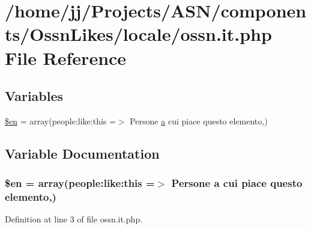 \hypertarget{components_2_ossn_likes_2locale_2ossn_8it_8php}{}\section{/home/jj/\+Projects/\+A\+S\+N/components/\+Ossn\+Likes/locale/ossn.it.\+php File Reference}
\label{components_2_ossn_likes_2locale_2ossn_8it_8php}
\subsection*{Variables}
\begin{DoxyCompactItemize}
\item 
\hyperlink{components_2_ossn_likes_2locale_2ossn_8it_8php_a48abc714dfb71c8fffa83cf49f452115}{\$en} = array(\textquotesingle{}people\+:like\+:this\textquotesingle{} =$>$ \textquotesingle{}Persone \hyperlink{_chart_8min_8js_aef3b685c08bc6c76c8e729bd0e93901d}{a} cui piace questo elemento\textquotesingle{},)
\end{DoxyCompactItemize}


\subsection{Variable Documentation}
\subsubsection[{\texorpdfstring{\$en}{$en}}]{\setlength{\rightskip}{0pt plus 5cm}\$en = array(\textquotesingle{}people\+:like\+:this\textquotesingle{} =$>$ \textquotesingle{}Persone {\bf a} cui piace questo elemento\textquotesingle{},)}\hypertarget{components_2_ossn_likes_2locale_2ossn_8it_8php_a48abc714dfb71c8fffa83cf49f452115}{}\label{components_2_ossn_likes_2locale_2ossn_8it_8php_a48abc714dfb71c8fffa83cf49f452115}


Definition at line 3 of file ossn.\+it.\+php.

